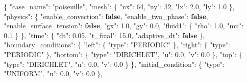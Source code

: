 \documentclass[
  french,
]{article}
\newenvironment{Shaded}{}{}
\newcommand{\DataTypeTok}[1]{\textcolor[rgb]{0.56,0.13,0.00}{#1}}
\newcommand{\DecValTok}[1]{\textcolor[rgb]{0.25,0.63,0.44}{#1}}
\newcommand{\FloatTok}[1]{\textcolor[rgb]{0.25,0.63,0.44}{#1}}
\newcommand{\FunctionTok}[1]{\textcolor[rgb]{0.02,0.16,0.49}{#1}}
\newcommand{\KeywordTok}[1]{\textcolor[rgb]{0.00,0.44,0.13}{\textbf{#1}}}
\newcommand{\StringTok}[1]{\textcolor[rgb]{0.25,0.44,0.63}{#1}}
\begin{document}
\begin{Shaded}
\begin{Highlighting}[]
\FunctionTok{\{}
  \DataTypeTok{"case\_name"}\FunctionTok{:} \StringTok{"poiseuille"}\FunctionTok{,}
  \DataTypeTok{"mesh"}\FunctionTok{:} \FunctionTok{\{} \DataTypeTok{"nx"}\FunctionTok{:} \DecValTok{64}\FunctionTok{,} \DataTypeTok{"ny"}\FunctionTok{:} \DecValTok{32}\FunctionTok{,} \DataTypeTok{"lx"}\FunctionTok{:} \FloatTok{2.0}\FunctionTok{,} \DataTypeTok{"ly"}\FunctionTok{:} \FloatTok{1.0} \FunctionTok{\},}
  \DataTypeTok{"physics"}\FunctionTok{:} \FunctionTok{\{}
    \DataTypeTok{"enable\_convection"}\FunctionTok{:} \KeywordTok{false}\FunctionTok{,}
    \DataTypeTok{"enable\_two\_phase"}\FunctionTok{:} \KeywordTok{false}\FunctionTok{,}
    \DataTypeTok{"enable\_surface\_tension"}\FunctionTok{:} \KeywordTok{false}\FunctionTok{,}
    \DataTypeTok{"gx"}\FunctionTok{:} \FloatTok{1.0}\FunctionTok{,} \DataTypeTok{"gy"}\FunctionTok{:} \FloatTok{0.0}\FunctionTok{,}
    \DataTypeTok{"fluid1"}\FunctionTok{:} \FunctionTok{\{} \DataTypeTok{"rho"}\FunctionTok{:} \FloatTok{1.0}\FunctionTok{,} \DataTypeTok{"mu"}\FunctionTok{:} \FloatTok{0.1} \FunctionTok{\}}
  \FunctionTok{\},}
  \DataTypeTok{"time"}\FunctionTok{:} \FunctionTok{\{} \DataTypeTok{"dt"}\FunctionTok{:} \FloatTok{0.05}\FunctionTok{,} \DataTypeTok{"t\_final"}\FunctionTok{:} \FloatTok{15.0}\FunctionTok{,} \DataTypeTok{"adaptive\_dt"}\FunctionTok{:} \KeywordTok{false} \FunctionTok{\},}
  \DataTypeTok{"boundary\_conditions"}\FunctionTok{:} \FunctionTok{\{}
    \DataTypeTok{"left"}\FunctionTok{:}   \FunctionTok{\{} \DataTypeTok{"type"}\FunctionTok{:} \StringTok{"PERIODIC"} \FunctionTok{\},}
    \DataTypeTok{"right"}\FunctionTok{:}  \FunctionTok{\{} \DataTypeTok{"type"}\FunctionTok{:} \StringTok{"PERIODIC"} \FunctionTok{\},}
    \DataTypeTok{"bottom"}\FunctionTok{:} \FunctionTok{\{} \DataTypeTok{"type"}\FunctionTok{:} \StringTok{"DIRICHLET"}\FunctionTok{,} \DataTypeTok{"u"}\FunctionTok{:} \FloatTok{0.0}\FunctionTok{,} \DataTypeTok{"v"}\FunctionTok{:} \FloatTok{0.0} \FunctionTok{\},}
    \DataTypeTok{"top"}\FunctionTok{:}    \FunctionTok{\{} \DataTypeTok{"type"}\FunctionTok{:} \StringTok{"DIRICHLET"}\FunctionTok{,} \DataTypeTok{"u"}\FunctionTok{:} \FloatTok{0.0}\FunctionTok{,} \DataTypeTok{"v"}\FunctionTok{:} \FloatTok{0.0} \FunctionTok{\}}
  \FunctionTok{\},}
  \DataTypeTok{"initial\_condition"}\FunctionTok{:} \FunctionTok{\{} \DataTypeTok{"type"}\FunctionTok{:} \StringTok{"UNIFORM"}\FunctionTok{,} \DataTypeTok{"u"}\FunctionTok{:} \FloatTok{0.0}\FunctionTok{,} \DataTypeTok{"v"}\FunctionTok{:} \FloatTok{0.0} \FunctionTok{\},}

\end{Highlighting}
\end{Shaded}
\end{document}
